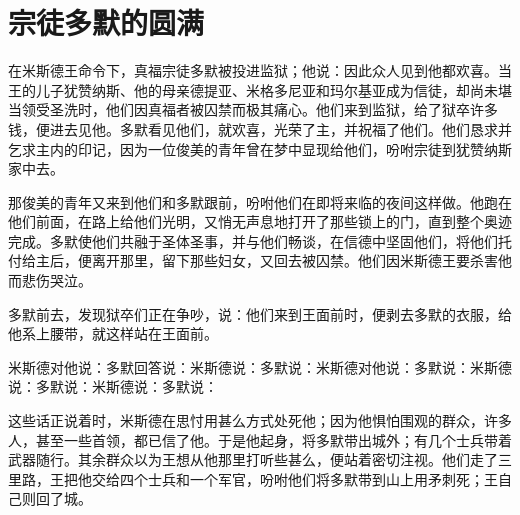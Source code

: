 
\chapter{宗徒多默的圆满}


在米斯德王命令下，真福宗徒多默被投进监狱；他说：因此众人见到他都欢喜。当王的儿子犹赞纳斯、他的母亲德提亚、米格多尼亚和玛尔基亚成为信徒，却尚未堪当领受圣洗时，他们因真福者被囚禁而极其痛心。他们来到监狱，给了狱卒许多钱，便进去见他。多默看见他们，就欢喜，光荣了主，并祝福了他们。他们恳求并乞求主内的印记，因为一位俊美的青年曾在梦中显现给他们，吩咐宗徒到犹赞纳斯家中去。\par

那俊美的青年又来到他们和多默跟前，吩咐他们在即将来临的夜间这样做。他跑在他们前面，在路上给他们光明，又悄无声息地打开了那些锁上的门，直到整个奥迹完成。多默使他们共融于圣体圣事，并与他们畅谈，在信德中坚固他们，将他们托付给主后，便离开那里，留下那些妇女，又回去被囚禁。他们因米斯德王要杀害他而悲伤哭泣。\par

多默前去，发现狱卒们正在争吵，说：他们来到王面前时，便剥去多默的衣服，给他系上腰带，就这样站在王面前。\par

米斯德对他说：多默回答说：米斯德说：多默说：米斯德对他说：多默说：米斯德说：多默说：米斯德说：多默说：\par

这些话正说着时，米斯德在思忖用甚么方式处死他；因为他惧怕围观的群众，许多人，甚至一些首领，都已信了他。于是他起身，将多默带出城外；有几个士兵带着武器随行。其余群众以为王想从他那里打听些甚么，便站着密切注视。他们走了三里路，王把他交给四个士兵和一个军官，吩咐他们将多默带到山上用矛刺死；王自己则回了城。\par

